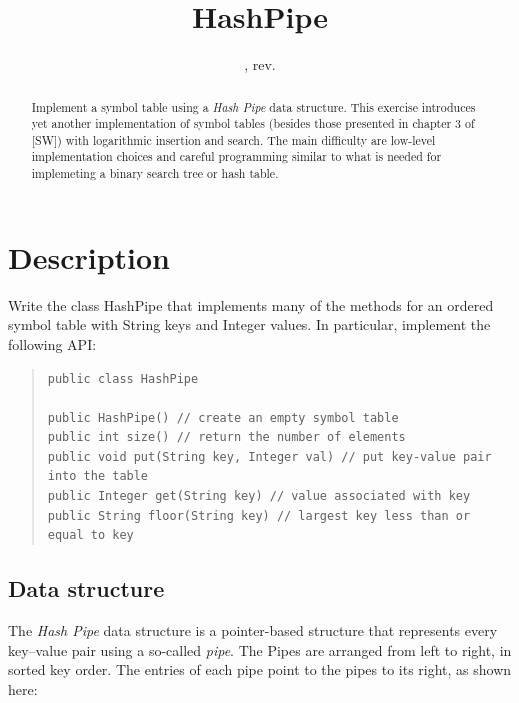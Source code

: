 \documentclass{tufte-handout}
\title{HashPipe}
\author{}
\date{\GITAuthorDate, rev. \GITAbrHash}
\begin{document}
\maketitle

\begin{abstract}
  Implement a symbol table using a \emph{Hash Pipe} data structure.
  This exercise introduces yet another implementation of symbol tables (besides those presented in chapter 3 of [SW]) with logarithmic insertion and search.
  The main difficulty are low-level implementation choices and careful programming  similar to what is needed for implemeting a binary search tree or hash table.
\end{abstract}

\section{Description}

Write the class HashPipe that implements many of the methods for an ordered symbol table with String keys and Integer values. 
In particular, implement the following API:

\begin{quotation}
\begin{fullwidth}\small
\begin{verbatim}
public class HashPipe 

public HashPipe() // create an empty symbol table
public int size() // return the number of elements
public void put(String key, Integer val) // put key-value pair into the table
public Integer get(String key) // value associated with key
public String floor(String key) // largest key less than or equal to key 
 \end{verbatim}
\end{fullwidth}
\end{quotation}

\subsection{Data structure}

The \emph{Hash Pipe} data structure is a pointer-based structure that represents every key--value pair using a so-called \emph{pipe}.
The Pipes are arranged from left to right, in sorted key order.
The entries of each pipe point to the pipes to its right, as shown here:
\end{document}
